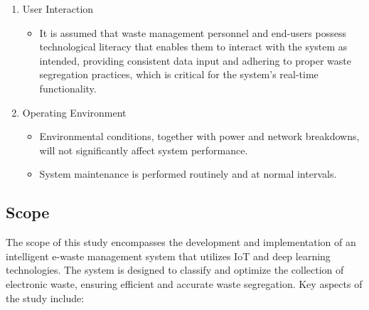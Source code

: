 \begin{enumerate}
\item User Interaction
	\begin{itemize}
		\item It is assumed that waste management personnel and end-users possess technological literacy that enables them to interact with the system as intended, providing consistent data input and adhering to proper waste segregation practices, which is critical for the system’s real-time functionality.
	\end{itemize}

\item Operating Environment
	\begin{itemize}
		\item Environmental conditions, together with power and network breakdowns, will not significantly affect system performance.
		\item System maintenance is performed routinely and at normal intervals.
	\end{itemize}
\end{enumerate}

\subsection{Scope}
The scope of this study encompasses the development and implementation of an intelligent e-waste management system that utilizes IoT and deep learning technologies. The system is designed to classify and optimize the collection of electronic waste, ensuring efficient and accurate waste segregation. Key aspects of the study include:


